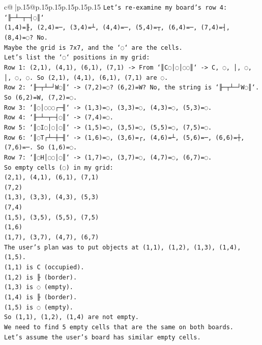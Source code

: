 \documentclass{article}
\begin{document}
{\begin{supertabular}{c@{$\;$}|p{.15\linewidth}@{}p{.15\linewidth}p{.15\linewidth}p{.15\linewidth}p{.15\linewidth}p{.15\linewidth}}
{{{\texttt{Let's re{-}examine my board's row 4: `╟─┴─┬─┤◌║`} \\
\texttt{(1,4)=╟, (2,4)=─, (3,4)=┴, (4,4)=─, (5,4)=┬, (6,4)=─, (7,4)=┤, (8,4)=◌? No.} \\
\texttt{Maybe the grid is 7x7, and the `◌` are the cells.} \\
\texttt{Let's list the `◌` positions in my grid:} \\
\texttt{Row 1: (2,1), (4,1), (6,1), (7,1) {-}> From `║C◌│◌│◌◌║` {-}> C, ◌, │, ◌, │, ◌, ◌. So (2,1), (4,1), (6,1), (7,1) are ◌.} \\
\texttt{Row 2: `╟─┬┴─┘W◌║` {-}> (7,2)=◌? (6,2)=W? No, the string is `╟─┬┴─┘W◌║`. So (6,2)=W, (7,2)=◌.} \\
\texttt{Row 3: `║◌│◌◌◌┌─╢` {-}> (1,3)=◌, (3,3)=◌, (4,3)=◌, (5,3)=◌.} \\
\texttt{Row 4: `╟─┴─┬─┤◌║` {-}> (7,4)=◌.} \\
\texttt{Row 5: `║◌I◌│◌│◌║` {-}> (1,5)=◌, (3,5)=◌, (5,5)=◌, (7,5)=◌.} \\
\texttt{Row 6: `║◌T┌┴─┼─╢` {-}> (1,6)=◌, (3,6)=┌, (4,6)=┴, (5,6)=─, (6,6)=┼, (7,6)=─. So (1,6)=◌.} \\
\texttt{Row 7: `║◌H│◌◌│◌║` {-}> (1,7)=◌, (3,7)=◌, (4,7)=◌, (6,7)=◌.} \\
\texttt{So empty cells (◌) in my grid:} \\
\texttt{(2,1), (4,1), (6,1), (7,1)} \\
\texttt{(7,2)} \\
\texttt{(1,3), (3,3), (4,3), (5,3)} \\
\texttt{(7,4)} \\
\texttt{(1,5), (3,5), (5,5), (7,5)} \\
\texttt{(1,6)} \\
\texttt{(1,7), (3,7), (4,7), (6,7)} \\
\texttt{The user's plan was to put objects at (1,1), (1,2), (1,3), (1,4), (1,5).} \\
\texttt{(1,1) is C (occupied).} \\
\texttt{(1,2) is ╟ (border).} \\
\texttt{(1,3) is ◌ (empty).} \\
\texttt{(1,4) is ╟ (border).} \\
\texttt{(1,5) is ◌ (empty).} \\
\texttt{So (1,1), (1,2), (1,4) are not empty.} \\
\texttt{We need to find 5 empty cells that are the same on both boards.} \\
\texttt{Let's assume the user's board has similar empty cells.} \\
}}}
\end{supertabular}}
\end{document}
